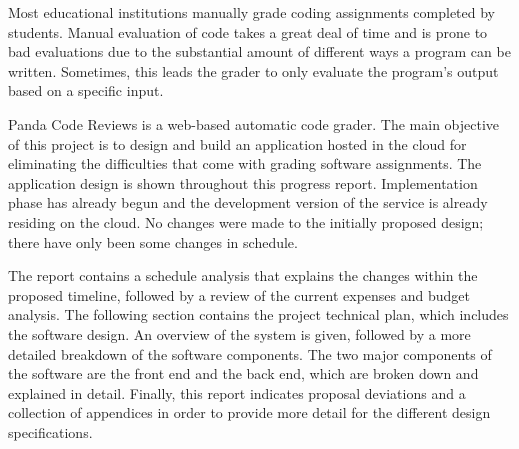 
Most educational institutions manually grade coding assignments completed by
students. Manual evaluation of code takes a great deal of time and is prone to
bad evaluations due to the substantial amount of different ways a program can be
written. Sometimes, this leads the grader to only evaluate the program's output
based on a specific input.

Panda Code Reviews is a web-based automatic code grader. The main objective of
this project is to design and build an application hosted in the cloud for
eliminating the difficulties that come with grading software assignments. The
application design is shown throughout this progress report. Implementation
phase has already begun and the development version of the service is already
residing on the cloud. No changes were made to the initially proposed design;
there have only been some changes in schedule.

The report contains a schedule analysis that explains the changes within the
proposed timeline, followed by a review of the current expenses and budget
analysis. The following section contains the project technical plan, which
includes the software design. An overview of the system is given, followed by a
more detailed breakdown of the software components. The two major components of
the software are the front end and the back end, which are broken down and
explained in detail. Finally, this report indicates proposal deviations and a
collection of appendices in order to provide more detail for the different
design specifications.
